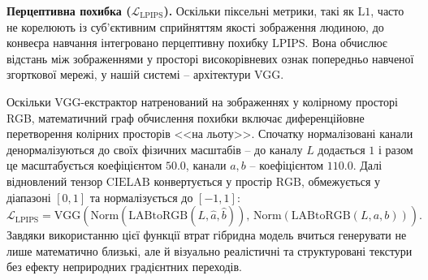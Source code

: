                 \textbf{Перцептивна похибка ($\mathcal{L}_{\mathrm{LPIPS}}$).}
                Оскільки піксельні метрики, такі як $\mathrm{L1}$, часто не корелюють із суб'єктивним сприйняттям якості зображення людиною,
                до конвеєра навчання інтегровано перцептивну похибку $\mathrm{LPIPS}$.
                Вона обчислює відстань між зображеннями у просторі високорівневих ознак попередньо навченої згорткової мережі, у нашій системі -- архітектури VGG.
                
                Оскільки VGG-екстрактор натренований на зображеннях у колірному просторі RGB, математичний граф обчислення похибки включає диференційовне перетворення колірних просторів <<на льоту>>.
                Спочатку нормалізовані канали денормалізуються до своїх фізичних масштабів -- до каналу $L$ додається $1$ і разом це масштабується коефіцієнтом $50.0$, канали $a, b$ -- коефіцієнтом $110.0$.
                Далі відновлений тензор $\mathrm{CIELAB}$ конвертується у простір $\mathrm{RGB}$, обмежується у діапазоні $[0, 1]$ та нормалізується до $[-1, 1]$:
                \begin{equation*}
                    \mathcal{L}_{\mathrm{LPIPS}} = \mathrm{VGG}\left( \mathrm{Norm}(\mathrm{LABtoRGB}(L, \hat{a}, \hat{b})), \, \mathrm{Norm}(\mathrm{LABtoRGB}(L, a, b)) \right).
                \end{equation*}
                Завдяки використанню цієї функції втрат гібридна модель вчиться генерувати не лише математично близькі, але й візуально реалістичні та структуровані текстури без ефекту неприродних градієнтних переходів.


